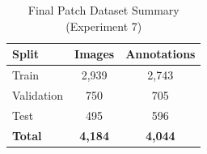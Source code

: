 \begin{table}[H]
\centering
\caption{Final Patch Dataset Summary (Experiment 7)}
\begin{tabular}{lcc}
\toprule
\rowcolor{tableHeader}\tableheadfont Split & \tableheadfont Images & \tableheadfont Annotations \\
\midrule
Train       & 2,939 & 2,743 \\
\rowcolor{tableRowAlt}Validation  & 750   & 705   \\
Test        & 495   & 596   \\
\rowcolor{tableRowAlt}\textbf{Total} & \textbf{4,184} & \textbf{4,044} \\
\bottomrule
\end{tabular}
\end{table}
